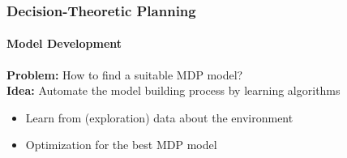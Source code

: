 \begin{frame}[t]
\frametitle{Decision-Theoretic Planning}
\framesubtitle{Model Development}
\vspace{8pt}
\textcolor{tudBlack}{\textbf{Problem:}} How to find a suitable MDP model?\\
\vspace{14pt}
\textcolor{tudblue}{\textbf{Idea:}} Automate the model building process by learning algorithms 
\begin{itemize}
	\item Learn from (exploration) data about the environment
	\item Optimization for the best MDP model
\end{itemize}

\end{frame}